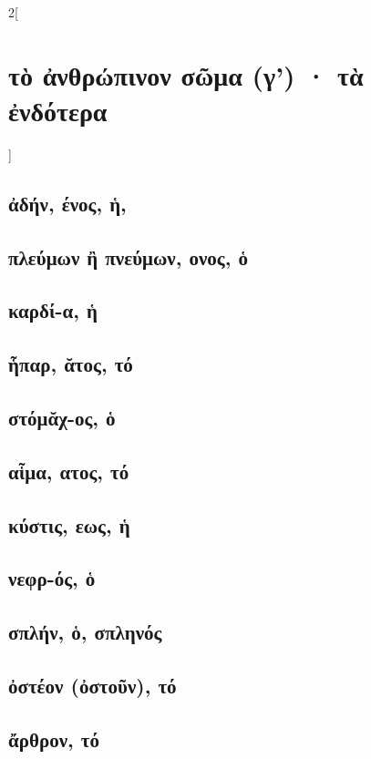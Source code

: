 \documentclass{book}
\begin{document}
\begin{multicols}{2}[\section{τὸ ἀνθρώπινον σῶμα (γ') · τὰ ἐνδότερα}]
\subsection{ἀδήν, ένος, ἡ,}
\subsection{πλεύμων ἢ πνεύμων, ονος, ὁ}
\subsection{καρδί-α, ἡ}
\subsection{ἧπαρ, ᾰτος, τό}
\subsection{στόμᾰχ-ος, ὁ}      
\subsection{αἷμα, ατος, τό}    
\subsection{κύστις, εως, ἡ}
\subsection{νεφρ-ός, ὁ}    
\subsection{σπλήν, ὁ, σπληνός}
\subsection{ὀστέον (ὀστοῦν), τό}          
\subsection{ἄρθρον, τό}                   

\end{multicols}
\end{document}
